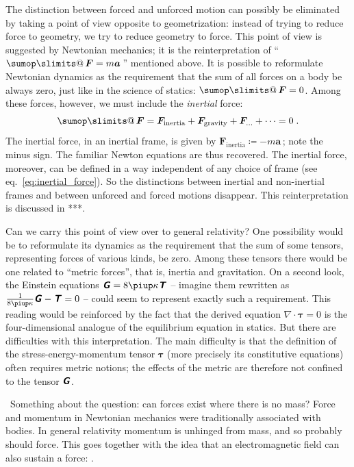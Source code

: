 \documentclass[\ifafour a4paper,12pt,\else a5paper,10pt,\fi%
onecolumn,oneside,article,%
british%
]{memoir}
\makeatletter
\theoremstyle{remark}
\theoremstyle{innote}
\def\sum{\DOTSI\sumop\slimits@}
\newcommand*{\mathte}[1]{\textbf{\textit{\textsf{#1}}}}
\newcommand*{\pu}{\piup}%
\newcommand*{\defd}{\coloneqq}
\renewcommand*{\|}[1][]{\nonscript\,#1\vert\nonscript\;\mathopen{}}
\newcommand*{\sect}{\S}%
\newcommand*{\eqn}{eq.}%
\newcommand*{\tsum}{\mathop{\textstyle\sum}\nolimits}
\newcommand*{\puzzle}{{\fontencoding{U}\fontfamily{fontawesometwo}\selectfont\symbol{225}}}
\newcommand*{\wrench}{{\fontencoding{U}\fontfamily{fontawesomethree}\selectfont\symbol{114}}}
\newcommand{\mynote}[1]{ {\color{notecolour}\wrench\ #1}}
\newcommand*{\psect}{{\footnotesize\puzzle}}%
\newcommand*{\yGG}{G}
\newcommand*{\yG}{\mathte{\yGG}}
\newcommand*{\yTT}{\tau}
\newcommand*{\yT}{\bm{\yTT}}
\newcommand*{\yTTf}{T}
\newcommand*{\yTf}{\mathte{\yTTf}}
\newcommand*{\ynab}{\nabla}
\makeatother
\begin{document}
The distinction between forced and unforced motion can possibly be
eliminated by taking a point of view opposite to geometrization: instead of
trying to reduce force to geometry, we try to reduce geometry to force.
This point of view is suggested by Newtonian mechanics; it is the
reinterpretation of \enquote{\,$\tsum\bm{F} = m\bm{a}$\,} mentioned above.
It is possible to reformulate Newtonian dynamics as the requirement that
the sum of all forces on a body be always zero, just like in the science of
statics: $\tsum \bm{F} = 0$. Among these forces, however, we must include
the \emph{inertial} force:
\[\tsum \bm{F} = \bm{F}_{\text{inertia}} + \bm{F}_{\text{gravity}}
  + \bm{F}_{\dotso} + \dotsb = 0\;.\] The inertial force, in an inertial
frame, is given by $\bm{F}_{\text{inertia}} \defd -m \bm{a}$\,; note the
minus sign. The familiar Newton equations are thus recovered. The inertial
force, moreover, can be defined in a way independent of any choice of frame
(see \eqn~\eqref{eq:inertial_force}). So the distinctions between inertial
and non-inertial frames and between unforced and forced motions disappear.
This reinterpretation is discussed in \psect***.

Can we carry this point of view over to general relativity? One possibility
would be to reformulate its dynamics as the requirement that the sum of
some tensors, representing forces of various kinds, be zero. Among these
tensors there would be one related to \enquote{metric forces}, that is,
inertia and gravitation. On a second look, the Einstein equations
$\yG = 8\pu\kappa\yTf$ -- imagine them rewritten as
$\frac{1}{8\pu\kappa}\yG - \yTf=0$ -- could seem to represent exactly such
a requirement. This reading would be reinforced by the fact that the
derived equation $\ynab\cdot\yT = 0$ is the four-dimensional analogue of
the equilibrium equation in statics. But there are difficulties with this
interpretation. The main difficulty is that the definition of the
stress-energy-momentum tensor $\yT$ (more precisely its constitutive
equations) often requires metric notions; the effects of the metric are
therefore not confined to the tensor $\yG$.

\bigskip

\mynote{Something about the question: can forces exist where there is no
  mass? Force and momentum in Newtonian mechanics were traditionally
  associated with bodies. In general relativity momentum is unhinged from
  mass, and so probably should force. This goes together with the idea that
  an electromagnetic field can also sustain a force: \textcites[\sect~158,
  pp.~534--535]{page1928_r1958}{ericksen2007}.}
\end{document}
